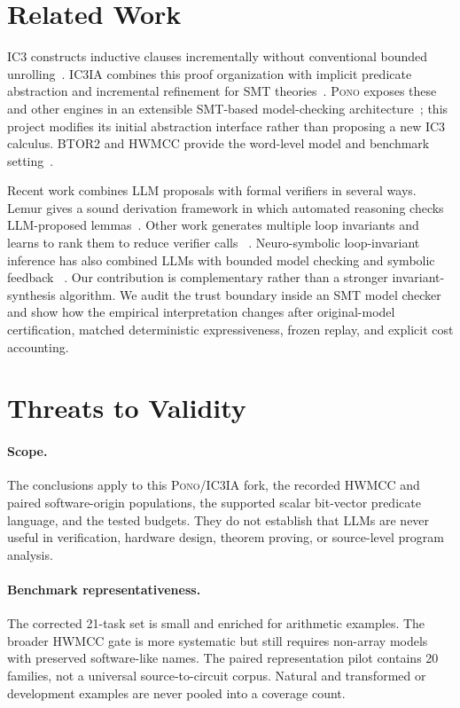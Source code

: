 \documentclass[10pt]{article}
\newcommand{\pono}{\textsc{Pono}}
\newcommand{\icthreeia}{\textsc{IC3IA}}
\newcommand{\btor}{\textsc{BTOR2}}
\begin{document}
\section{Related Work}

IC3 constructs inductive clauses incrementally without conventional bounded
unrolling~\cite{Bradley2011IC3}.  \icthreeia{} combines this proof organization
with implicit predicate abstraction and incremental refinement for SMT
theories~\cite{Cimatti2014IC3IA}.  \pono{} exposes these and other engines in
an extensible SMT-based model-checking architecture~\cite{Mann2021Pono}; this
project modifies its initial abstraction interface rather than proposing a new
IC3 calculus.  \btor{} and HWMCC provide the word-level model and benchmark
setting~\cite{Niemetz2018BTOR2,HWMCC}.

Recent work combines LLM proposals with formal verifiers in several ways.
Lemur gives a sound derivation framework in which automated reasoning checks
LLM-proposed lemmas~\cite{Wu2024Lemur}.  Other work generates multiple loop
invariants and learns to rank them to reduce verifier calls
~\cite{Chakraborty2023Ranking}.  Neuro-symbolic loop-invariant inference has
also combined LLMs with bounded model checking and symbolic feedback
~\cite{Wu2024BMC}.  Our contribution is complementary rather than a stronger
invariant-synthesis algorithm.  We audit the trust boundary inside an SMT model
checker and show how the empirical interpretation changes after
original-model certification, matched deterministic expressiveness, frozen
replay, and explicit cost accounting.

\section{Threats to Validity}

\paragraph{Scope.}
The conclusions apply to this \pono{}/\icthreeia{} fork, the recorded HWMCC and
paired software-origin populations, the supported scalar bit-vector predicate
language, and the tested budgets.  They do not establish that LLMs are never
useful in verification, hardware design, theorem proving, or source-level
program analysis.

\paragraph{Benchmark representativeness.}
The corrected 21-task set is small and enriched for arithmetic examples.  The
broader HWMCC gate is more systematic but still requires non-array models with
preserved software-like names.  The paired representation pilot contains 20
families, not a universal source-to-circuit corpus.  Natural and transformed or
development examples are never pooled into a coverage count.
\end{document}

